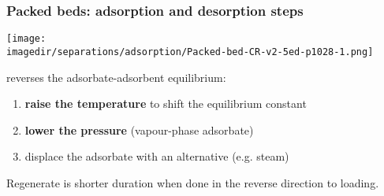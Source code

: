 \begin{frame}\frametitle{Packed beds: adsorption and desorption steps}
	\begin{center}
		\texttt{[image: \\imagedir/separations/adsorption/Packed-bed-CR-v2-5ed-p1028-1.png]}
	\end{center}
	\vspace{-6pt}

	{\color{purple}{Regeneration}} reverses the adsorbate-adsorbent equilibrium:
	\begin{enumerate}
		\item	\textbf{raise the temperature} to shift the equilibrium constant
		\item	\textbf{lower the pressure} (vapour-phase adsorbate)
		\item	displace the adsorbate with an alternative (e.g. steam)
	\end{enumerate}
	Regenerate is shorter duration when done in the reverse direction to loading.

\end{frame}

